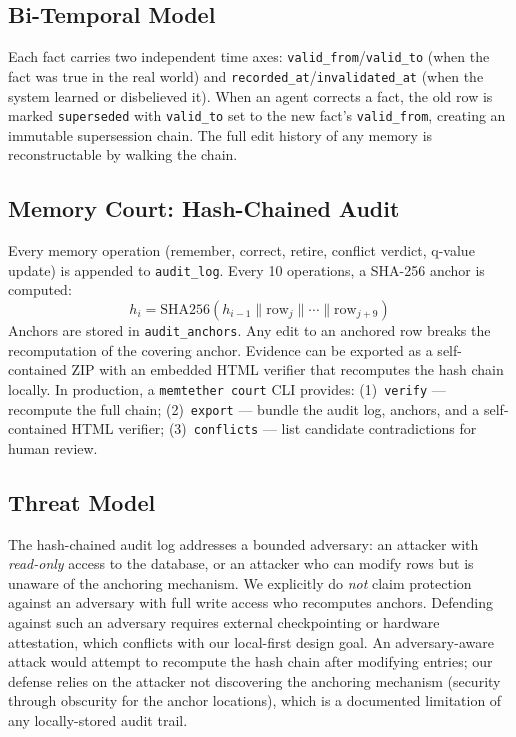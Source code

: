 \documentclass{article}
\begin{document}
\subsection{Bi-Temporal Model}
Each fact carries two independent time axes: \texttt{valid\_from}/\texttt{valid\_to} (when the fact was true in the real world) and \texttt{recorded\_at}/\texttt{invalidated\_at} (when the system learned or disbelieved it). When an agent corrects a fact, the old row is marked \texttt{superseded} with \texttt{valid\_to} set to the new fact's \texttt{valid\_from}, creating an immutable supersession chain. The full edit history of any memory is reconstructable by walking the chain.

\subsection{Memory Court: Hash-Chained Audit}
Every memory operation (remember, correct, retire, conflict verdict, q-value update) is appended to \texttt{audit\_log}. Every 10 operations, a SHA-256 anchor is computed:
\[
h_i = \text{SHA256}(h_{i-1} \| \text{row}_{j} \| \cdots \| \text{row}_{j+9})
\]
Anchors are stored in \texttt{audit\_anchors}. Any edit to an anchored row breaks the recomputation of the covering anchor. Evidence can be exported as a self-contained ZIP with an embedded HTML verifier that recomputes the hash chain locally. In production, a \texttt{memtether court} CLI provides: (1)~\texttt{verify} --- recompute the full chain; (2)~\texttt{export} --- bundle the audit log, anchors, and a self-contained HTML verifier; (3)~\texttt{conflicts} --- list candidate contradictions for human review.

\subsection{Threat Model}
\label{sec:threat}
The hash-chained audit log addresses a bounded adversary: an attacker with \emph{read-only} access to the database, or an attacker who can modify rows but is unaware of the anchoring mechanism. We explicitly do \emph{not} claim protection against an adversary with full write access who recomputes anchors. Defending against such an adversary requires external checkpointing or hardware attestation, which conflicts with our local-first design goal. An adversary-aware attack would attempt to recompute the hash chain after modifying entries; our defense relies on the attacker not discovering the anchoring mechanism (security through obscurity for the anchor locations), which is a documented limitation of any locally-stored audit trail.
\end{document}
